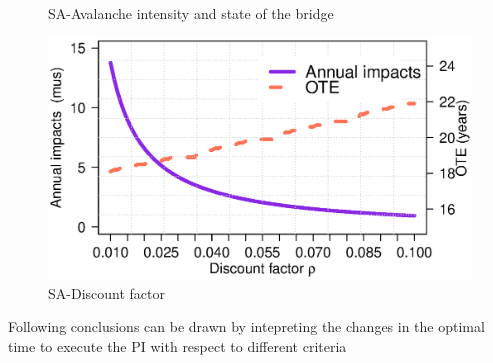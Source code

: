 \documentclass[fleqn]{article}
\begin{document}
\begin{figure}[ht!]
  \begin{center}
    \caption{SA-Avalanche intensity and state of the bridge}
    \label{reliabilitybridge}
  \end{center}
\end{figure}

\begin{figure}[ht!]
  \begin{center}
    \includegraphics[width=0.4\linewidth]{discount}
    \caption{SA-Discount factor}
    \label{SAdiscount}
  \end{center}
\end{figure}

Following conclusions can be drawn by intepreting the changes in the optimal time to execute the PI with respect to different criteria
\end{document}
